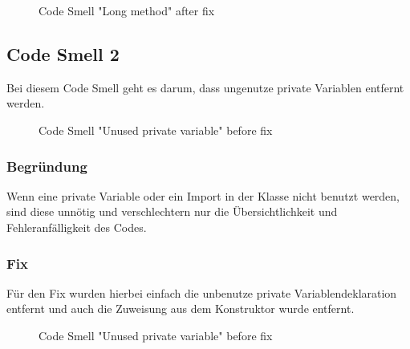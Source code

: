         \begin{figure}[h]
	        \centering
	        \caption{Code Smell "Long method" after fix}
	        \label{a.2.cleanArchitecture}
        \end{figure}
    
    

    \subsection{Code Smell 2}
    Bei diesem Code Smell geht es darum, dass ungenutze private Variablen entfernt werden.
    \begin{figure}[h]
	    \centering
	    \caption{Code Smell "Unused private variable" before fix}
	    \label{a.2.cleanArchitecture}
    \end{figure}

        \subsubsection{Begründung}
        Wenn eine private Variable oder ein Import in der Klasse nicht benutzt werden, sind diese unnötig und verschlechtern nur die Übersichtlichkeit und Fehleranfälligkeit des Codes. 

        \subsubsection{Fix}
        Für den Fix wurden hierbei einfach die unbenutze private Variablendeklaration entfernt und auch die Zuweisung aus dem Konstruktor wurde entfernt.
        \begin{figure}[h]
	        \centering
	        \caption{Code Smell "Unused private variable" before fix}
	        \label{a.2.cleanArchitecture}
        \end{figure}
